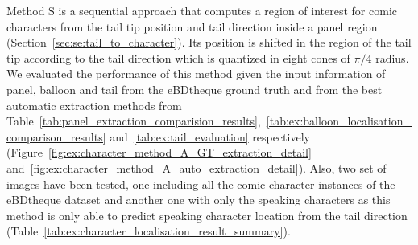 Method S is a sequential approach that computes a region of interest for comic characters from the tail tip position and tail direction inside a panel region (Section~\ref{sec:se:tail_to_character}).
Its position is shifted in the region of the tail tip according to the tail direction which is quantized in eight cones of $\pi/4$ radius.
We evaluated the performance of this method given the input information of panel, balloon and tail from the eBDtheque ground truth and from the best automatic extraction methods from Table~\ref{tab:panel_extraction_comparision_results},~\ref{tab:ex:balloon_localisation_comparison_results} and~\ref{tab:ex:tail_evaluation} respectively (Figure~\ref{fig:ex:character_method_A_GT_extraction_detail} and~\ref{fig:ex:character_method_A_auto_extraction_detail}).
Also, two set of images have been tested, one including all the comic character instances of the eBDtheque dataset and another one with only the speaking characters as this method is only able to predict speaking character location from the tail direction (Table~\ref{tab:ex:character_localisation_result_summary}).

 





